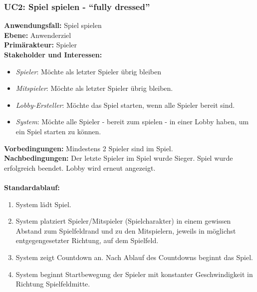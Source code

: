 \documentclass[11pt,ngerman]{article}
\newcommand{\quotes}[1]{``#1''}
\begin{document}
        \subsubsection{UC2: Spiel spielen - \quotes{fully dressed}}
            \begin{tcolorbox}[enhanced, breakable, sharp corners, width=\dimexpr\textwidth-15mm\relax ,enlarge left by=10mm ,fontupper=\linespread{1.1}\selectfont, boxrule=1pt, title={UC2: Spiel spielen}, colback=white, colframe=gray!22, coltitle=black]

                \textbf{Anwendungsfall:} Spiel spielen \\
                \textbf{Ebene:} Anwenderziel \\
                \textbf{Primärakteur:} Spieler \\
                \textbf{Stakeholder und Interessen:}
                \begin{itemize}
                    \item \textit{Spieler}: Möchte als letzter Spieler übrig bleiben
                    \item \textit{Mitspieler}: Möchte als letzter Spieler übrig bleiben.
                    \item \textit{Lobby-Ersteller}:  Möchte das Spiel starten, wenn alle Spieler bereit sind.
                    \item \textit{System}: Möchte alle Spieler - bereit zum spielen - in einer \Gls{Lobby} haben, um ein Spiel starten zu können.
                \end{itemize}
                \textbf{Vorbedingungen:} Mindestens 2 Spieler sind im Spiel.\\
                \textbf{Nachbedingungen:} Der letzte Spieler im Spiel wurde Sieger. Spiel wurde erfolgreich beendet. \Gls{Lobby} wird erneut angezeigt. \\
               \\  \textbf{Standardablauf:}
                \begin{enumerate}
                    \item System lädt Spiel.
                    \item System platziert Spieler/Mitspieler (Spielcharakter) in einem gewissen Abstand zum Spielfeldrand und zu den Mitspielern, jeweils in möglichst entgegengesetzter Richtung, auf dem Spielfeld.
                    \item System zeigt Countdown an. Nach Ablauf des Countdowns beginnt das Spiel.
                    \item System beginnt Startbewegung der Spieler mit konstanter Geschwindigkeit in Richtung Spielfeldmitte.

\end{enumerate}
\end{tcolorbox}
\end{document}
